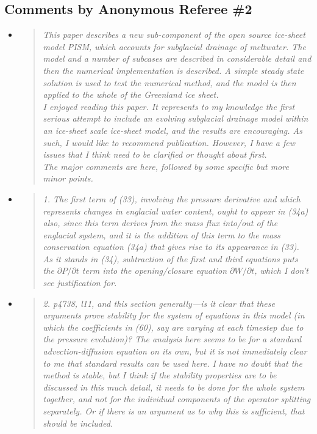 \documentclass[11pt,reqno]{amsart}
\newcommand{\reply}[2]{
\medskip\medskip
\item  \begin{quote}
\emph{#1}
\end{quote}

\medskip
\noindent #2}
\begin{document}
\subsection*{Comments by Anonymous Referee \#2}\begin{itemize}
\reply{This paper describes a new sub-component of the open source ice-sheet model PISM,
which accounts for subglacial drainage of meltwater.  The model and a number of
subcases are described in considerable detail and then the numerical implementation
is described.  A simple steady state solution is used to test the numerical method, and
the model is then applied to the whole of the Greenland ice sheet.\\
I enjoyed reading this paper.  It represents to my knowledge the first serious attempt
to include an evolving subglacial drainage model within an ice-sheet scale ice-sheet
model, and the results are encouraging.  As such, I would like to recommend publication.  However, I have a few issues that I think need to be clarified or thought about first.\\
The major comments are here, followed by some specific but more minor points.}
{}

\reply{1. The first term of (33), involving the pressure derivative and which represents
changes in englacial water content, ought to appear in (34a) also, since this term
derives from the mass flux into/out of the englacial system, and it is the addition
of this term to the mass conservation equation (34a) that gives rise to its appearance in (33).  As it stands in (34), subtraction of the first and third equations
puts the $\partial P/\partial t$ term into the opening/closure equation $\partial W/\partial t$, which I don't see justification for.}
{}

\reply{2. p4738, l11, and this section generally---is it clear that these arguments prove
stability for the \emph{system} of equations in this model (in which the coefficients in (60),
say are varying at each timestep due to the pressure evolution)? The analysis
here seems to be for a standard advection-diffusion equation on its own, but it
is not immediately clear to me that standard results can be used here. I have
no doubt that the method is stable, but I think if the stability properties are to be
discussed in this much detail, it needs to be done for the whole system together,
and not for the individual components of the operator splitting separately. Or if
there is an argument as to why this is sufficient, that should be included.}
{}


\end{itemize}
\end{document}
